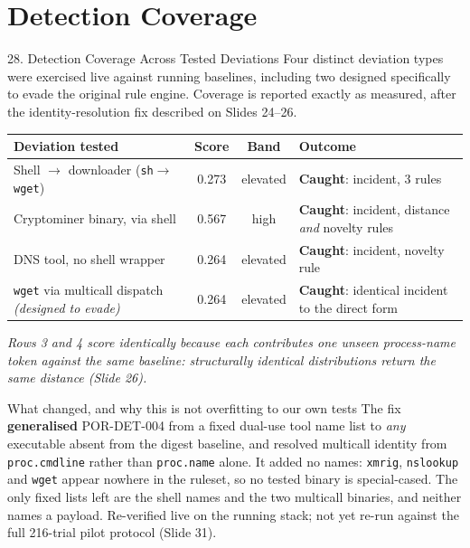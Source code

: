 \documentclass[aspectratio=169, 11pt]{beamer}
\renewcommand{\arraystretch}{1.15}
\newcommand{\hl}[1]{\textcolor{keyRed}{\textbf{#1}}}
\begin{document}
\section{Detection Coverage}
\begin{frame}{28. Detection Coverage Across Tested Deviations}
    \scriptsize
    Four distinct deviation types were exercised live against running baselines, including two designed
    specifically to evade the original rule engine. Coverage is reported exactly as measured, after the
    identity-resolution fix described on Slides 24--26.
    \begin{table}
        \centering\scriptsize
        \renewcommand{\arraystretch}{1.2}
        \begin{tabular}{p{4.4cm} c c p{3.4cm}}
            \toprule
            \textbf{Deviation tested} & \textbf{Score} & \textbf{Band} & \textbf{Outcome} \\
            \midrule
            Shell $\to$ downloader (\texttt{sh}$\to$\texttt{wget}) & 0.273 & elevated & \textcolor{amritaMaroon}{\textbf{Caught}}: incident, 3 rules \\
            Cryptominer binary, via shell & 0.567 & high & \textcolor{amritaMaroon}{\textbf{Caught}}: incident, distance \emph{and} novelty rules \\
            DNS tool, no shell wrapper & 0.264 & elevated & \textcolor{amritaMaroon}{\textbf{Caught}}: incident, novelty rule \\
            \texttt{wget} via multicall dispatch \emph{(designed to evade)} & 0.264 & elevated & \textcolor{amritaMaroon}{\textbf{Caught}}: identical incident to the direct form \\
            \bottomrule
        \end{tabular}
    \end{table}
    \vspace{-0.15cm}
    \centering\scriptsize\emph{Rows 3 and 4 score identically because each contributes one unseen process-name token
    against the same baseline: structurally identical distributions return the same distance (Slide 26).}
    \par\raggedright
    \begin{block}{\scriptsize What changed, and why this is not overfitting to our own tests}
        \scriptsize The fix \hl{generalised} POR-DET-004 from a fixed dual-use tool name list to \emph{any} executable absent
        from the digest baseline, and resolved multicall identity from \texttt{proc.cmdline} rather than \texttt{proc.name} alone.
        It added no names: \texttt{xmrig}, \texttt{nslookup} and \texttt{wget} appear nowhere in the ruleset, so no tested
        binary is special-cased. The only fixed lists left are the shell names and the two multicall binaries, and neither
        names a payload. Re-verified live on the running stack; not yet re-run against the full 216-trial pilot
        protocol (Slide 31).
    \end{block}
\end{frame}
\end{document}

